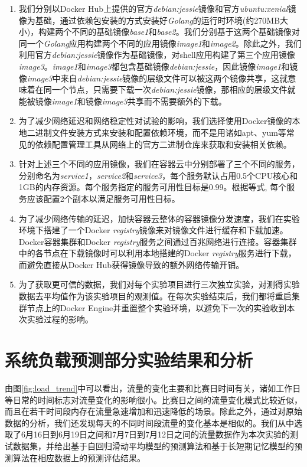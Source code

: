 \begin{enumerate}
\item\label{req:serv_image} 我们分别以Docker Hub上提供的官方\emph{debian:jessie}镜像和官方\emph{ubuntu:xenial}镜像为基础，通过依赖包安装的方式安装好\emph{Golang}的运行时环境(约270MB大小)，构建两个不同的基础镜像\emph{base1}和\emph{base2}。我们分别基于这两个基础镜像对同一个\emph{Golang}应用构建两个不同的应用镜像\emph{image1}和\emph{image2}。除此之外，我们利用官方\emph{debian:jessie}镜像作为基础镜像，对shell应用构建了第三个应用镜像\emph{image3}。\emph{image1}和\emph{image3}都包含基础镜像\emph{debian:jessie}，因此镜像\emph{image1}和镜像\emph{image3}中来自\emph{debian:jessie}镜像的层级文件可以被这两个镜像共享，这就意味着在同一个节点，只需要下载一次\emph{debian:jessie}镜像，那相应的层级文件就能被镜像\emph{image1}和镜像\emph{image3}共享而不需要额外的下载。

\item 为了减少网络延迟和网络稳定性对试验的影响，我们选择使用Docker镜像的本地二进制文件安装方式来安装和配置依赖环境，而不是用诸如apt、yum等常见的依赖配置管理工具从网络上的官方二进制仓库来获取和安装相关依赖。

\item\label{req:serv_aval} 针对上述三个不同的应用镜像，我们在容器云中分别部署了三个不同的服务，分别命名为\emph{service1}，\emph{service2}和\emph{service3}，每个服务默认占用0.5个CPU核心和1GB的内存资源。每个服务指定的服务可用性目标是0.99。根据等式, 每个服务应该配置2个副本以满足服务可用性目标。

\item\label{req:registry_mirror} 为了减少网络传输的延迟，加快容器云整体的容器镜像分发速度，我们在实验环境下搭建了一个Docker \emph{registry}镜像来对镜像文件进行缓存和下载加速。Docker容器集群和Docker \emph{registry}服务之间通过百兆网络进行连接。容器集群中的各节点在下载镜像时可以利用本地搭建的Docker \emph{registry}服务进行下载，而避免直接从Docker Hub获得镜像导致的额外网络传输开销。

\item 为了获取更可信的数据，我们对每个实验项目进行三次独立实验，对测得实验数据去平均值作为该实验项目的观测值。在每次实验结束后，我们都将重启集群节点上的Docker Engine并重置整个实验环境，以避免下一次的实验收到本次实验过程的影响。
\end{enumerate}

\section{系统负载预测部分实验结果和分析}
由图\ref{fig:load_trend}中可以看出，流量的变化主要和比赛日时间有关，诸如工作日等日常的时间标志对流量变化的影响很小。比赛日之间的流量变化模式比较近似，而且在若干时间段内存在流量急速增加和迅速降低的场景。除此之外，通过对原始数据的分析，我们还发现每天的不同时间段流量的变化基本是相似的。我们从中选取了6月16日到6月19日之间和7月7日到7月12日之间的流量数据作为本次实验的测试数据集，并给出基于自回归滑动平均模型的预测算法和基于长短期记忆模型的预测算法在相应数据上的预测评估结果。
